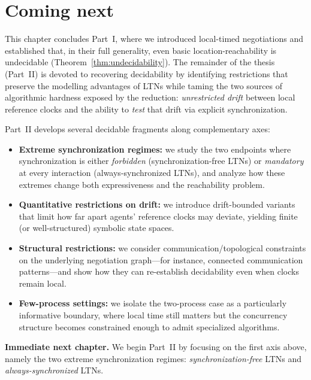 \section{Coming next}
\label{sec:next-ch3}

This chapter concludes Part~I, where we introduced local-timed negotiations and
established that, in their full generality, even basic location-reachability is
undecidable (Theorem~\ref{thm:undecidability}).  The remainder of the thesis
(Part~II) is devoted to recovering decidability by identifying restrictions that
preserve the modelling advantages of LTNs while taming the two sources of
algorithmic hardness exposed by the reduction: \emph{unrestricted drift} between
local reference clocks and the ability to \emph{test} that drift via explicit
synchronization.

Part~II develops several decidable fragments along complementary axes:
\begin{itemize}
  \item \textbf{Extreme synchronization regimes:} we study the two endpoints where
        synchronization is either \emph{forbidden} (synchronization-free LTNs) or
        \emph{mandatory} at every interaction (always-synchronized LTNs), and
        analyze how these extremes change both expressiveness and the reachability
        problem.
  \item \textbf{Quantitative restrictions on drift:} we introduce drift-bounded
        variants that limit how far apart agents' reference clocks may deviate,
        yielding finite (or well-structured) symbolic state spaces.
  \item \textbf{Structural restrictions:} we consider communication/topological
        constraints on the underlying negotiation graph---for instance, connected
        communication patterns---and show how they can re-establish decidability
        even when clocks remain local.
  \item \textbf{Few-process settings:} we isolate the two-process case as a
        particularly informative boundary, where local time still matters but the
        concurrency structure becomes constrained enough to admit specialized
        algorithms.
\end{itemize}

\smallskip
\noindent\textbf{Immediate next chapter.}
We begin Part~II by focusing on the first axis above, namely the two extreme
synchronization regimes: \emph{synchronization-free} LTNs and \emph{always-synchronized}
LTNs.
